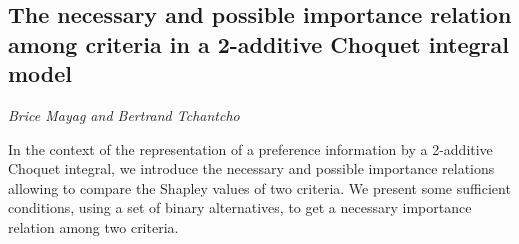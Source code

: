 \documentclass[../booklet.tex]{subfiles}
\begin{document}
\subsection[The necessary and possible importance relation among criteria in a 2-additive Choquet integral model. {\it Brice Mayag and Bertrand Tchantcho}]{The necessary and possible importance relation among criteria in a 2-additive Choquet integral model}
 

\begin{center}
  {\it Brice Mayag and Bertrand Tchantcho}
\end{center}



In the context of the representation of a preference information by a 2-additive Choquet integral, we introduce  the necessary and possible importance relations allowing to compare the Shapley values of two criteria. We present some sufficient conditions, using a set of binary alternatives, to get a necessary importance relation among two criteria. 

\end{document}
